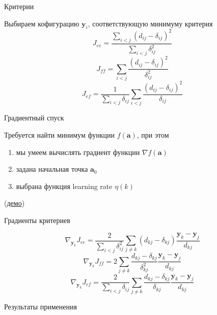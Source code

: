 \documentclass[10pt]{beamer}
\begin{document}
\begin{frame}{Критерии}

Выбираем кофигурацию $\mathbf{y}_i$, соответствующую минимуму критерия
\[
J_{ee} = \frac{\sum_{i < j} (d_{ij} - \delta_{ij})^2} {\sum_{i < j} \delta_{ij}^2}
\]
\[
J_{ff} = \sum_{i < j} \frac{(d_{ij} - \delta_{ij})^2}{\delta_{ij}^2}
\]
\[
J_{ef} = \frac{1} {\sum_{i < j} \delta_{ij}}\sum_{i < j} \frac{(d_{ij} - \delta_{ij})^2}{\delta_{ij}}
\]

\end{frame}


\begin{frame}{Градиентный спуск}

Требуется найти минимум функции $f(\mathbf{a})$, при этом
\begin{enumerate}
\item мы умеем вычислять градиент функции $\nabla f(\mathbf{a})$
\item задана начальная точка $\mathbf{a}_0$
\item выбрана функция learning rate $\eta(k)$
\end{enumerate}

\gd

(\href{http://vis.supstat.com/2013/03/gradient-descent-algorithm-with-r/}{демо})

\end{frame}

\begin{frame}{Градиенты критериев}

\[
\nabla_{\mathbf{y}_k}J_{ee} = \frac{2} {\sum_{i < j} \delta_{ij}^2} \sum_{j \neq k} (d_{kj} - \delta_{kj}) \frac{\mathbf{y}_k - \mathbf{y}_j}{d_{kj}}
\]
\[
\nabla_{\mathbf{y}_k} J_{ff} = 2 \sum_{j \neq k} \frac{d_{kj} - \delta_{kj}}{\delta_{kj}^2} \frac{\mathbf{y}_k - \mathbf{y}_j}{d_{kj}}
\]
\[
\nabla_{\mathbf{y}_k} J_{ef} = \frac{2} {\sum_{i < j} \delta_{ij}} \sum_{j \neq k} \frac{d_{kj} - \delta_{kj}}{\delta_{kj}} \frac{\mathbf{y}_k - \mathbf{y}_j}{d_{kj}}
\]

\end{frame}

\begin{frame}{Результаты применения}

\end{frame}
\end{document}
